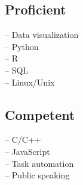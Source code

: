 \documentclass[12pt]{cavender_cv}
\begin{document}
\begin{minipage}[t]{0.25\textwidth}
\subsection*{Proficient}
-- Data visualization \\
-- Python \\
-- R \\
-- SQL \\
-- Linux/Unix \\


\subsection*{Competent}
-- C/C++ \\
-- JavaScript \\
-- Task automation \\
-- Public speaking \\


\end{minipage}
\end{document}
